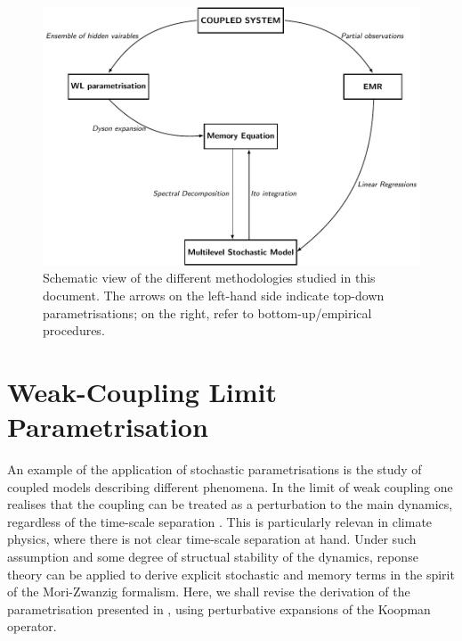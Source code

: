 \documentclass[12pt]{article}
\begin{document}
\begin{figure}[H]
	\centering
	\includegraphics[width=\textwidth]{plots/general/scheme_parametrisation.pdf}
	\caption{\label{schematic}Schematic view of the different methodologies studied in this document. The arrows on the left-hand side indicate top-down parametrisations; on the right, refer to bottom-up/empirical procedures.}
\end{figure}

\section{Weak-Coupling Limit Parametrisation}\label{weak-coupling limit parametrisation}

An example of the application of stochastic parametrisations is the study of coupled models describing different phenomena. In the limit of weak coupling one realises that the coupling can be treated as a perturbation to the main dynamics, regardless of the time-scale separation \cite{Wouters2012, wouters2013, lucariniwouters}. This is particularly relevan in climate physics, where there is not clear time-scale separation at hand. Under such assumption and some degree of structual stability of the dynamics, reponse theory can be applied to derive explicit stochastic and memory terms in the spirit of the Mori-Zwanzig formalism. Here, we shall revise the derivation of the parametrisation presented in \cite{wouters2013, lucariniwouters}, using perturbative expansions of the Koopman operator.
\end{document}
